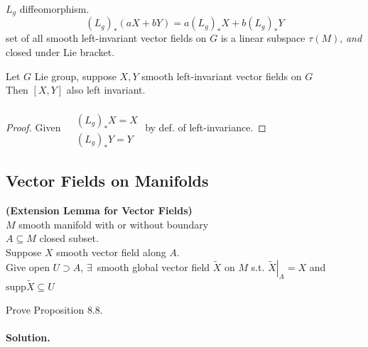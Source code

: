 $L_g$ diffeomorphism.  
\[
(L_g)_*(aX+ bY) = a(L_g)_*X + b(L_g)_* Y
\]
set of all smooth left-invariant vector fields on $G$ is a linear subspace $\tau(M)$, \emph{ and } closed under Lie bracket.  

\begin{lemma}[4.18] 
Let $G$ Lie group, suppose $X,Y$ smooth left-invariant vector fields on $G$ \\
Then $[X,Y]$ also left invariant.  
\end{lemma}

\begin{proof}
  Given $\begin{aligned} & \quad \\ & (L_g)_*X = X \\ & (L_g)_* Y = Y \end{aligned}$ by def. of left-invariance.  
\end{proof}









\subsection*{Vector Fields on Manifolds}

\begin{lemma}[8.6] \textbf{(Extension Lemma for Vector Fields)} \\
  $M$ smooth manifold with or without boundary \\
$A \subseteq M$ closed subset. \\
Suppose $X$ smooth vector field along $A$.  \\
Give open $U \supset A$, $\exists \, $ smooth global vector field $\widetilde{X}$ on $M$ s.t. $\left. \widetilde{X} \right|_A = X$ and $\text{supp}{\widetilde{X}} \subseteq U$
\end{lemma}

\begin{exercise}
Prove Proposition 8.8.
\end{exercise}
\paragraph{Solution.}

